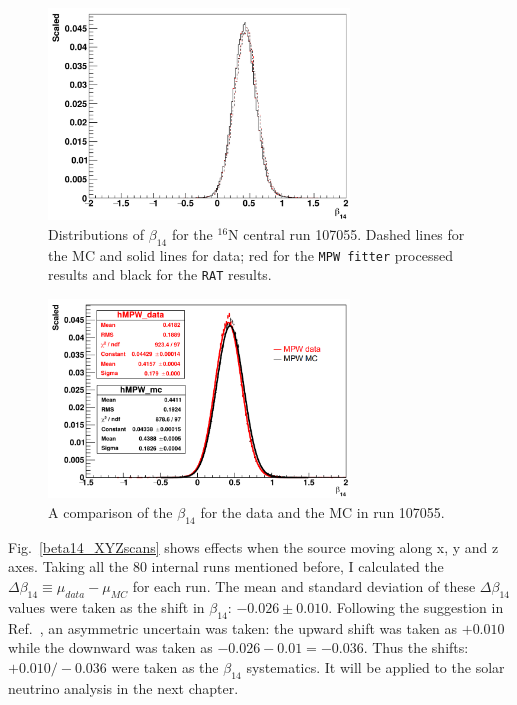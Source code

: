 \begin{figure}[htbp]
	\centering
	\includegraphics[width=8cm]{N16_beta14_107055.png}
	\caption[Distributions of $\beta_{14}$ for the $^{16}$N central run 107055.]{Distributions of $\beta_{14}$ for the $^{16}$N central run 107055. Dashed lines for the MC and solid lines for data; red for the \texttt{MPW fitter} processed results and black for the \texttt{RAT} results.}
	\label{fig:N16beta14}
\end{figure}

\begin{figure}[htbp]
	\centering
	\includegraphics[width=8cm]{N16FitMPW_beta14_107055.png}
	\caption{A comparison of the $\beta_{14}$ for the data and the MC in run 107055.}
	\label{fig:N16beta14MPW}
\end{figure}

Fig.~\ref{beta14_XYZscans} shows effects when the source moving along x, y and z axes. Taking all the 80 internal runs mentioned before, I calculated the $\Delta \beta_{14}\equiv\mu_{data}-\mu_{MC}$ for each run. The mean and standard deviation of these $\Delta \beta_{14}$ values were taken as the shift in $\beta_{14}$: $-0.026\pm0.010$. Following the suggestion in Ref.~\cite{waterunidoc}, an asymmetric uncertain was taken: the upward shift was taken as $+0.010$ while the downward was taken as $-0.026-0.01=-0.036$. Thus the shifts: $+0.010/-0.036$ were taken as the $\beta_{14}$ systematics. It will be applied to the solar neutrino analysis in the next chapter. 

